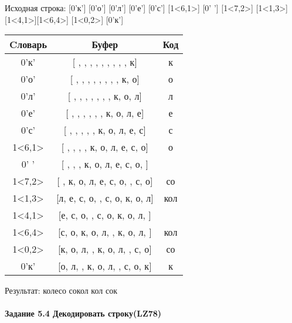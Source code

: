 \documentclass[a4paper, 12pt]{article}
\begin{document}
Исходная строка: [0'к'] [0'о'] [0'л'] [0'е'] [0'с'] [1<6,1>] [0' '] [1<7,2>] [1<1,3>] [1<4,1>][1<6,4>] [1<0,2>] [0'к']\\
\begin{table}[h!]
\centering
\begin{tabular}{|c|c|c|}
\hline
 Cловарь & Буфер & Код  \\ \hline
0'к' & [ ,  ,  ,  ,  ,  ,  ,  ,  , к] & к
\\ \hline
0'о' & [ ,  ,  ,  ,  ,  ,  ,  , к, о] & о
\\ \hline
0'л' & [ ,  ,  ,  ,  ,  ,  , к, о, л] & л
\\ \hline
0'е' & [ ,  ,  ,  ,  ,  , к, о, л, е] & е
\\ \hline
0'с' & [ ,  ,  ,  ,  , к, о, л, е, с] & с
\\ \hline
1<6,1> & [ ,  ,  ,  , к, о, л, е, с, о] & о
\\ \hline
0' ' & [ ,  ,  , к, о, л, е, с, о,  ] &  
\\ \hline
1<7,2> & [ , к, о, л, е, с, о,  , с, о] & со
\\ \hline
1<1,3> & [л, е, с, о,  , с, о, к, о, л] & кол
\\ \hline
1<4,1> & [е, с, о,  , с, о, к, о, л,  ] &  
\\ \hline
1<6,4> & [с, о, к, о, л,  , к, о, л,  ] & кол 
\\ \hline
1<0,2> & [к, о, л,  , к, о, л,  , с, о] & со
\\ \hline
0'к' & [о, л,  , к, о, л,  , с, о, к] & к
\\ \hline
\end{tabular}
\end{table}

Результат: колесо сокол кол сок
\pagebreak
\paragraph{Задание 5.4 Декодировать строку(LZ78)\\}
\end{document}
